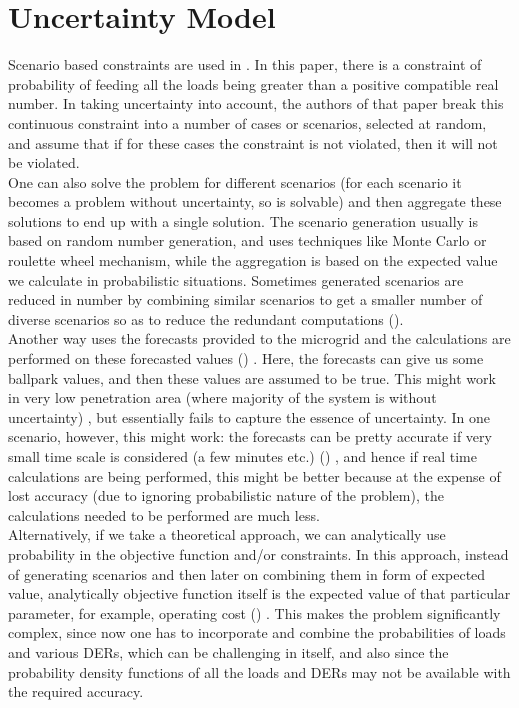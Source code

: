 \section{Uncertainty Model}
Scenario based constraints are used in \citep{mgrj02}. In this paper, there is a constraint of probability of feeding all the loads being greater than a positive compatible real number. In taking uncertainty into account, the authors of that paper break this continuous constraint into a number of cases or scenarios, selected at random, and assume that if for these cases the constraint is not violated, then it will not be violated.\\
One can also solve the problem for different scenarios (for each scenario it becomes a problem without uncertainty, so is solvable) and then aggregate these solutions to end up with a single solution. The scenario generation usually is based on random number generation, and uses techniques like Monte Carlo \citep{mgrj15} or roulette wheel mechanism\citep{mgrj49}, while the aggregation is based on the expected value we calculate in probabilistic situations. Sometimes generated scenarios are reduced in number by combining similar scenarios to get a smaller number of diverse scenarios so as to reduce the redundant computations (\citep{mgrj49}).\\
Another way uses the forecasts provided to the microgrid and the calculations are performed on these forecasted values (\citep{mgrj07}) . Here, the forecasts can give us some ballpark values, and then these values are assumed to be true. This might work in very low penetration area (where majority of the system is without uncertainty) , but essentially fails to capture the essence of uncertainty. In one scenario, however, this might work: the forecasts can be pretty accurate if very small time scale is considered (a few minutes etc.) (\citep{mgrj57}) , and hence if real time calculations are being performed, this might be better because at the expense of lost accuracy (due to ignoring probabilistic nature of the problem), the calculations needed to be performed are much less.\\
Alternatively, if we take a theoretical approach, we can  analytically use probability in the objective function and/or constraints. In this approach, instead of generating scenarios and then later on combining them in form of expected value, analytically objective function itself is the expected value of that particular parameter, for example, operating cost (\citep{mgrj04}) . This makes the problem significantly complex, since now one has to incorporate and combine the probabilities of loads and various DERs, which can be challenging in itself, and also since the probability density functions of all the loads and DERs may not be available with the required accuracy.
